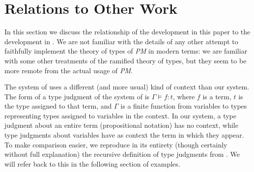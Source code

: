 \documentclass{article}
\begin{document}
\section{Relations to Other Work}

In this section we discuss the relationship of the development in this
paper to the development in \cite{types40}.  We are not familiar with
the details of any other attempt to faithfully implement the theory of
types of {\em PM\/} in modern terms: we are familiar with some other
treatments of the ramified theory of types, but they seem to be more
remote from the actual usage of {\em PM\/}.

The system of \cite{types40} uses a different (and more usual) kind of
context than our system.  The form of a type judgment of the system of
\cite{types40} is $\Gamma \models f:t$, where $f$ is a term, $t$ is
the type assigned to that term, and $\Gamma$ is a finite function from
variables to types representing types assigned to variables in the
context.  In our system, a type judgment about an entire term
(propositional notation) has no context, while type judgments about
variables have as context the term in which they appear.  To make
comparison easier, we reproduce in its entirety (though certainly
without full explanation) the recursive definition of type judgments
from \cite{types40}.  We will refer back to this in the following
section of examples.
\end{document}
